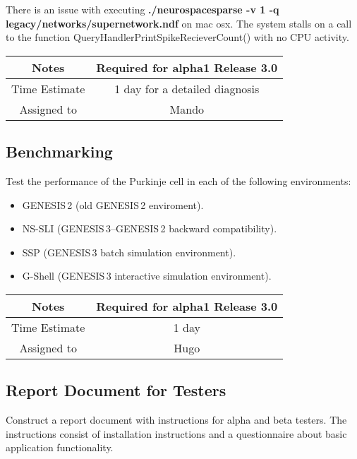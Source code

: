 \documentclass[12pt]{article}
\begin{document}
There is an issue with executing {\bf ./neurospacesparse -v 1 -q
  legacy/networks/supernetwork.ndf} on mac osx. The system stalls on a
call to the function QueryHandlerPrintSpikeRecieverCount() with no CPU
activity.

{
  \vspace{5mm}
  \centering
  \begin{tabular}{|c|c|}
    \hline
    Notes
    & Required for alpha1 Release 3.0 \\
    \hline
    Time Estimate
    & 1 day for a detailed diagnosis \\
    \hline
    Assigned to
    & Mando \\
    \hline
  \end{tabular}
}



\subsection{Benchmarking}

Test the performance of the Purkinje cell in each of the following
environments:

\begin{itemize}
\item GENESIS\,2 (old GENESIS\,2 enviroment).
\item NS-SLI (GENESIS\,3--GENESIS\,2 backward compatibility).
\item SSP (GENESIS\,3 batch simulation environment).
\item G-Shell (GENESIS\,3 interactive simulation environment).
\end{itemize}

{
  \vspace{5mm}
  \centering
  \begin{tabular}{|c|c|}
    \hline
    Notes
    & Required for alpha1 Release 3.0 \\
    \hline
    Time Estimate
    & 1 day \\
    \hline
    Assigned to
    & Hugo \\
    \hline
  \end{tabular}
}


\subsection{Report Document for Testers}

Construct a report document with instructions for alpha and beta
testers.  The instructions consist of installation instructions and a
questionnaire about basic application functionality.
\end{document}
